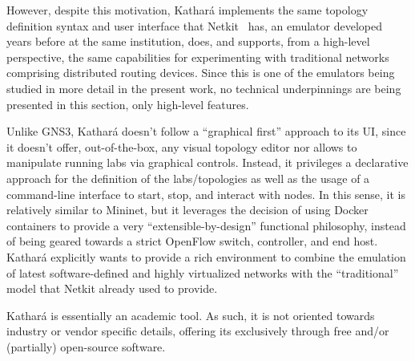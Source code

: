 However, despite this motivation, Kathará implements the same topology definition syntax and user interface that Netkit~\cite{netkit-short} has, an emulator developed years before at the same institution, does, and supports, from a high-level perspective, the same capabilities for experimenting with traditional networks comprising distributed routing devices.
Since this is one of the emulators being studied in more detail in the present work, no technical underpinnings are being presented in this section, only high-level features.

Unlike GNS3, Kathará doesn't follow a ``graphical first'' approach to its UI, since it doesn't offer, out-of-the-box, any visual topology editor nor allows to manipulate running labs via graphical controls.
Instead, it privileges a declarative approach for the definition of the labs/topologies as well as the usage of a command-line interface to start, stop, and interact with nodes.
In this sense, it is relatively similar to Mininet, but it leverages the decision of using Docker containers to provide a very ``extensible-by-design'' functional philosophy, instead of being geared towards a strict OpenFlow switch, controller, and end host.
Kathará explicitly wants to provide a rich environment to combine the emulation of latest software-defined and highly virtualized networks with the ``traditional'' model that Netkit already used to provide.

Kathará is essentially an academic tool.
As such, it is not oriented towards industry or vendor specific details, offering its exclusively through free and/or (partially) open-source software.

